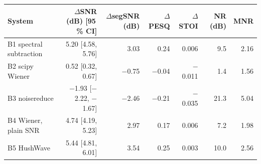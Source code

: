 \begin{tabular}{lrrrrrr}
\hline
\rowcolor{headfill} \textbf{System} & \textbf{$\Delta$SNR (dB) [95\,\% CI]} & \textbf{$\Delta$segSNR (dB)} & \textbf{$\Delta$PESQ} & \textbf{$\Delta$STOI} & \textbf{NR (dB)} & \textbf{MNR} \\ \hline
B1 spectral subtraction & 5.20 [4.58, 5.76] & 3.03 & 0.24 & 0.006 & 9.5 & 2.16 \\ \hline
B2 scipy Wiener & 0.52 [0.32, 0.67] & $-$0.75 & $-$0.04 & $-$0.011 & 1.4 & 1.56 \\ \hline
B3 noisereduce & $-$1.93 [$-$2.22, $-$1.67] & $-$2.46 & $-$0.21 & $-$0.035 & 21.3 & 5.04 \\ \hline
B4 Wiener, plain SNR & 4.74 [4.19, 5.23] & 2.97 & 0.17 & 0.006 & 7.2 & 1.98 \\ \hline
B5 HushWave & 5.44 [4.81, 6.01] & 3.54 & 0.25 & 0.003 & 10.0 & 2.56 \\ \hline
\end{tabular}
